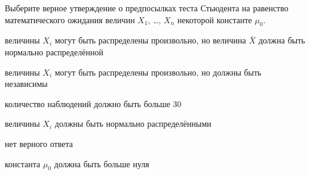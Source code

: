 
\begin{question}
Выберите верное утверждение о предпосылках теста Стьюдента на равенство
математического ожидания величин \(X_1\), \ldots, \(X_n\) некоторой
константе \(\mu_0\).
\begin{answerlist}
  \item величины \(X_i\) могут быть распределены произвольно, но величина
\(\bar X\) должна быть нормально распределённой
  \item величины \(X_i\) могут быть распределены произвольно, но должны быть
независимы
  \item количество наблюдений должно быть больше 30
  \item величины \(X_i\) должны быть нормально распределёнными
  \item нет верного ответа
  \item константа \(\mu_0\) должна быть больше нуля
\end{answerlist}
\end{question}



